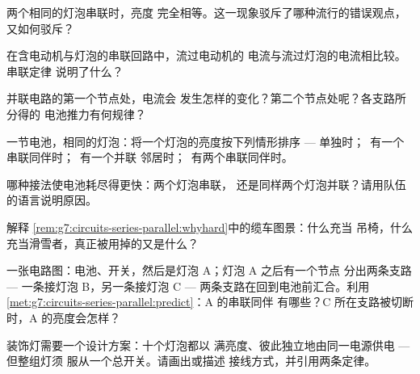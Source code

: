 \begin{exercise}[$\star$]\label{exo:g7:circuits-series-parallel:3}
两个相同的灯泡串联时，亮度
完全相等。这一现象驳斥了哪种流行的错误观点，又如何驳斥？
\end{exercise}

\begin{exercise}[$\star$]\label{exo:g7:circuits-series-parallel:4}
在含电动机与灯泡的串联回路中，流过电动机的
电流与流过灯泡的电流相比较。串联定律
说明了什么？
\end{exercise}

\begin{exercise}[$\star$]\label{exo:g7:circuits-series-parallel:5}
并联电路的第一个节点处，电流会
发生怎样的变化？第二个节点处呢？各支路所分得的
电池推力有何规律？
\end{exercise}

\begin{exercise}[$\star$]\label{exo:g7:circuits-series-parallel:6}
一节电池，相同的灯泡：将一个灯泡的亮度按下列情形排序 ---
单独时；\ 有一个串联同伴时；\ 有一个并联
邻居时；\ 有两个串联同伴时。
\end{exercise}

\begin{exercise}[$\star$]\label{exo:g7:circuits-series-parallel:7}
哪种接法使电池耗尽得更快：两个灯泡串联，
还是同样两个灯泡并联？请用队伍的语言说明原因。
\end{exercise}

\begin{exercise}[$\star$]\label{exo:g7:circuits-series-parallel:8}
解释
\cref{rem:g7:circuits-series-parallel:whyhard}中的缆车图景：什么充当
吊椅，什么充当滑雪者，真正被用掉的又是什么？
\end{exercise}

\begin{exercise}[$\star\star$]\label{exo:g7:circuits-series-parallel:9}
一张电路图：电池、开关，然后是灯泡 A；灯泡 A 之后有一个节点
分出两条支路 --- 一条接灯泡 B，另一条接灯泡 C ---
两条支路在回到电池前汇合。利用
\cref{met:g7:circuits-series-parallel:predict}：A 的串联同伴
有哪些？C 所在支路被切断时，A 的亮度会怎样？
\end{exercise}

\begin{exercise}[$\star\star$]\label{exo:g7:circuits-series-parallel:10}
装饰灯需要一个设计方案：十个灯泡都以
满亮度、彼此独立地由同一电源供电 --- 但整组灯须
服从一个总开关。请画出或描述
接线方式，并引用两条定律。
\end{exercise}

